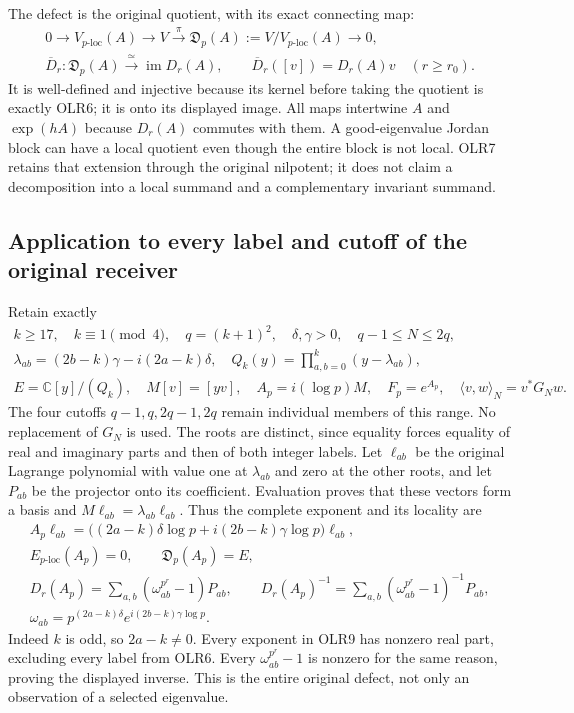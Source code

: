 The defect is the original quotient, with its exact connecting map:
\[
\begin{gathered}
0\longrightarrow V_{p\text{-loc}}(A)\longrightarrow V
\xrightarrow{\pi}\mathfrak D_p(A):=V/V_{p\text{-loc}}(A)
\longrightarrow0,\\
\overline D_r:\mathfrak D_p(A)\xrightarrow{\ \simeq\ }
       \operatorname{im}D_r(A),\qquad
\overline D_r([v])=D_r(A)v\quad(r\ge r_0).
\end{gathered}
\tag{OLR7}
\]
It is well-defined and injective because its kernel before taking
the quotient is exactly OLR6; it is onto its displayed image.
All maps intertwine $A$ and $\exp(hA)$ because $D_r(A)$ commutes
with them. A good-eigenvalue Jordan block can have a local quotient
even though the entire block is not local. OLR7 retains that extension
through the original nilpotent; it does not claim a decomposition
into a local summand and a complementary invariant summand.

\subsection{Application to every label and cutoff of the original receiver}

Retain exactly
\[
\begin{gathered}
k\ge17,\quad k\equiv1\pmod4,\quad q=(k+1)^2,
\quad\delta,\gamma>0,\quad q-1\le N\le2q,\\
\lambda_{ab}=(2b-k)\gamma-i(2a-k)\delta,\quad
Q_k(y)=\prod_{a,b=0}^k(y-\lambda_{ab}),\\
E=\mathbb C[y]/(Q_k),\quad M[v]=[yv],\quad
A_p=i(\log p)M,\quad F_p=e^{A_p},\quad
\langle v,w\rangle_N=v^*G_Nw.
\end{gathered}
\tag{OLR8}
\]
The four cutoffs $q-1,q,2q-1,2q$ remain individual members of this
range. No replacement of $G_N$ is used.
The roots are distinct, since equality forces equality of real and
imaginary parts and then of both integer labels.
Let $\ell_{ab}$ be the original Lagrange polynomial with value one
at $\lambda_{ab}$ and zero at the other roots, and let $P_{ab}$ be
the projector onto its coefficient. Evaluation proves that these
vectors form a basis and $M\ell_{ab}=\lambda_{ab}\ell_{ab}$.
Thus the complete exponent and its locality are
\[
\begin{gathered}
A_p\ell_{ab}
=\bigl((2a-k)\delta\log p+i(2b-k)\gamma\log p\bigr)\ell_{ab},\\
E_{p\text{-loc}}(A_p)=0,\qquad
\mathfrak D_p(A_p)=E,\\
D_r(A_p)=\sum_{a,b}(\omega_{ab}^{p^r}-1)P_{ab},\qquad
D_r(A_p)^{-1}=\sum_{a,b}(\omega_{ab}^{p^r}-1)^{-1}P_{ab},\\
\omega_{ab}=p^{(2a-k)\delta}e^{i(2b-k)\gamma\log p}.
\end{gathered}
\tag{OLR9}
\]
Indeed $k$ is odd, so $2a-k\ne0$. Every exponent in OLR9 has
nonzero real part, excluding every label from OLR6. Every
$\omega_{ab}^{p^r}-1$ is nonzero for the same reason, proving the
displayed inverse. This is the entire original defect, not only
an observation of a selected eigenvalue.

